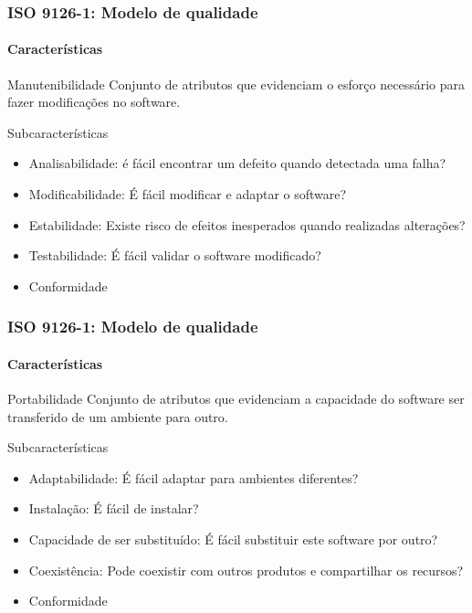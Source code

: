 \begin{frame}
	\frametitle{ISO 9126-1: Modelo de qualidade}
	\framesubtitle{Características}
	
	\begin{block:fact}{Manutenibilidade}
		Conjunto de atributos que evidenciam o esforço necessário para fazer
		modificações no software.
	\end{block:fact}
	
	\begin{block:fact}{Subcaracterísticas}
		\begin{itemize}
			\item Analisabilidade: é fácil encontrar um defeito quando detectada uma falha?
			\item Modificabilidade: É fácil modificar e adaptar o software?
			\item Estabilidade: Existe risco de efeitos inesperados quando realizadas alterações?
			\item Testabilidade: É fácil validar o software modificado?
			\item Conformidade
		\end{itemize}
	\end{block:fact}
\end{frame}


\begin{frame}
	\frametitle{ISO 9126-1: Modelo de qualidade}
	\framesubtitle{Características}
	
	\begin{block:fact}{Portabilidade}
		Conjunto de atributos que evidenciam a capacidade do software ser transferido
		de um ambiente para outro.
	\end{block:fact}
	
	\begin{block:fact}{Subcaracterísticas}
		\begin{itemize}
			\item Adaptabilidade: É fácil adaptar para ambientes diferentes?
			\item Instalação: É fácil de instalar?
			\item Capacidade de ser substituído: É fácil substituir este software por outro?
			\item Coexistência: Pode coexistir com outros produtos e compartilhar os recursos?
			\item Conformidade
		\end{itemize}
	\end{block:fact}
\end{frame}


